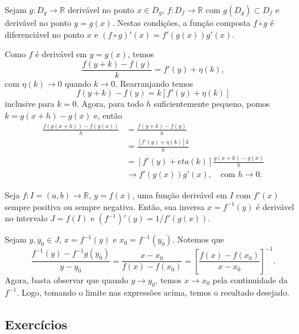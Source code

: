 \begin{teo}
  Sejam $g:D_g\to\mathbb{R}$ derivável no ponto $x\in D_g$, $f:D_f\to\mathbb{R}$ com $g(D_g)\subset D_f$ e derivável no ponto $y=g(x)$. Nestas condições, a função composta $f\circ g$ é diferenciável no ponto $x$ e $(f\circ g)'(x) = f'(g(x))g'(x)$.
\end{teo}
\begin{dem}
  Como $f$ é derivável em $y=g(x)$, temos
  \begin{equation}
    \frac{f(y+k) - f(y)}{k} = f'(y) + \eta(k),
  \end{equation}
com $\eta(k)\to 0$ quando $k\to 0$. Rearranjando temos
\begin{equation}
  f(y+k)-f(y) = k[f'(y) + \eta(k)]
\end{equation}
inclusive para $k=0$. Agora, para todo $h$ suficientemente pequeno, pomos $k = g(x+h) - g(x)$ e, então
\begin{equation}
  \begin{split}
    \frac{f(g(x+h))-f(g(x))}{h} &= \frac{f(y+k)-f(y)}{h}\\
    &= \frac{[f'(y)+\eta(k)]k}{h}\\
    &= [f'(y) + eta(k)]\frac{g(x+h)-g(x)}{h}\\
    &\to f'(g(x))g'(x),\quad\text{com }h\to 0.
  \end{split}
\end{equation}
\end{dem}

\begin{teo}
  Seja $f:I=(a, b)\to\mathbb{R}$, $y=f(x)$, uma função derivável em $I$ com $f'(x)$ sempre positiva ou sempre negativa. Então, sua inversa $x=f^{-1}(y)$ é derivável no intervalo $J = f(I)$ e $(f^{-1})'(y) = 1/f'(g(x))$.
\end{teo}
\begin{dem}
  Sejam $y,y_0\in J$, $x=f^{-1}(y)$ e $x_0=f^{-1}(y_0)$. Notemos que
  \begin{equation}
    \frac{f^{-1}(y)-f^{-1}g(y_0)}{y-y_0} = \frac{x-x_0}{f(x)-f(x_0)} = \left[\frac{f(x)-f(x_0)}{x-x_0}\right]^{-1}.
  \end{equation}
Agora, basta observar que quando $y\to y_0$, temos $x\to x_0$ pela continuidade da $f^{-1}$. Logo, tomando o limite nas expressões acima, temos o resultado desejado.
\end{dem}

\subsection*{Exercícios}

